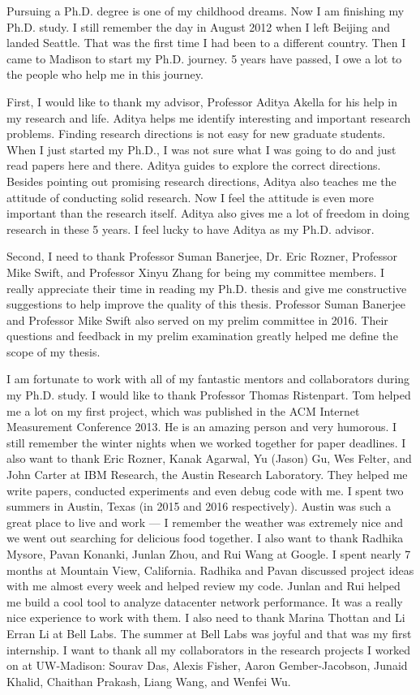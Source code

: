 

Pursuing a Ph.D. degree is one of my childhood dreams. 
Now I am finishing my Ph.D. study. I still remember the day in August 2012 when I left 
Beijing and landed Seattle. That was the first time I had been to 
a different country. Then I came to Madison to start my Ph.D. journey. 
5 years have passed, I owe a lot to the people who help me in this journey. 

First, I would like to thank my advisor, Professor Aditya Akella for 
his help in my research and life. Aditya helps me identify interesting and 
important research problems. Finding research directions is not easy for new 
graduate students. When I just started my Ph.D., I was not sure what I was going to do 
and just read papers here and there. Aditya guides to explore the correct directions. 
Besides pointing out promising research directions, Aditya also teaches me the 
attitude of conducting solid research. Now I feel the attitude is even more 
important than the research itself. Aditya also gives me a lot of freedom in doing 
research in these 5 years. I feel lucky to have Aditya as my Ph.D. advisor.

Second, I need to thank Professor Suman Banerjee, Dr. Eric Rozner, 
Professor Mike Swift, and Professor Xinyu Zhang for being my committee members. 
I really appreciate their time in reading my Ph.D. thesis and give me constructive 
suggestions to help improve the quality of this thesis. Professor Suman Banerjee 
and Professor Mike Swift also served on my prelim committee in 2016. 
Their questions and feedback in my prelim examination greatly helped me 
define the scope of my thesis.

I am fortunate to work with all of my fantastic mentors and collaborators during my Ph.D. study. 
I would like to thank Professor Thomas Ristenpart. Tom helped me a lot on my first project, 
which was published in the ACM Internet Measurement Conference 2013. He is an amazing 
person and very humorous. I still remember the winter nights when we worked together for 
paper deadlines. 
I also want to thank Eric Rozner, Kanak Agarwal, Yu (Jason) Gu, Wes Felter, and 
John Carter at IBM Research, the Austin Research Laboratory. They helped me write papers, 
conducted experiments and even debug code with me. I spent two summers in Austin, Texas 
(in 2015 and 2016 respectively). Austin was such a great place to live and work --- I 
remember the weather was extremely nice and we went out searching for delicious food 
together. I also want to thank Radhika Mysore, Pavan Konanki, Junlan Zhou, and Rui Wang 
at Google. I spent nearly 7 months at Mountain View, California. Radhika and Pavan 
discussed project ideas with me almost every week and helped review my code. 
Junlan and Rui helped me build a cool tool to analyze datacenter network performance. 
It was a really nice experience to work with them. I also need to thank Marina 
Thottan and Li Erran Li at Bell Labs. The summer at Bell Labs was joyful and that 
was my first internship. I want to thank all my collaborators in the research projects 
I worked on at UW-Madison: Sourav Das, Alexis Fisher, Aaron Gember-Jacobson, 
Junaid Khalid, Chaithan Prakash, Liang Wang, and Wenfei Wu. 


